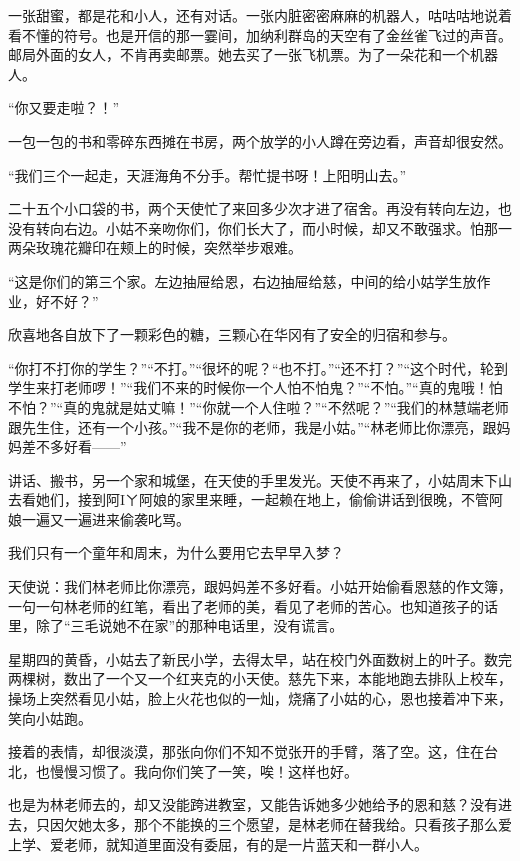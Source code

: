 \par 一张甜蜜，都是花和小人，还有对话。一张内脏密密麻麻的机器人，咕咕咕地说着看不懂的符号。也是开信的那一霎间，加纳利群岛的天空有了金丝雀飞过的声音。邮局外面的女人，不肯再卖邮票。她去买了一张飞机票。为了一朵花和一个机器人。
\par “你又要走啦？！”
\par 一包一包的书和零碎东西摊在书房，两个放学的小人蹲在旁边看，声音却很安然。
\par “我们三个一起走，天涯海角不分手。帮忙提书呀！上阳明山去。”
\par 二十五个小口袋的书，两个天使忙了来回多少次才进了宿舍。再没有转向左边，也没有转向右边。小姑不亲吻你们，你们长大了，而小时候，却又不敢强求。怕那一两朵玫瑰花瓣印在颊上的时候，突然举步艰难。
\par “这是你们的第三个家。左边抽屉给恩，右边抽屉给慈，中间的给小姑学生放作业，好不好？”
\par 欣喜地各自放下了一颗彩色的糖，三颗心在华冈有了安全的归宿和参与。
\par “你打不打你的学生？”“不打。”“很坏的呢？“也不打。”“还不打？”“这个时代，轮到学生来打老师啰！”“我们不来的时候你一个人怕不怕鬼？”“不怕。”“真的鬼哦！怕不怕？”“真的鬼就是姑丈嘛！”“你就一个人住啦？”“不然呢？”“我们的林慧端老师跟先生住，还有一个小孩。”“我不是你的老师，我是小姑。”“林老师比你漂亮，跟妈妈差不多好看——”
\par 讲话、搬书，另一个家和城堡，在天使的手里发光。天使不再来了，小姑周末下山去看她们，接到阿Iㄚ阿娘的家里来睡，一起赖在地上，偷偷讲话到很晚，不管阿娘一遍又一遍进来偷袭叱骂。
\par 我们只有一个童年和周末，为什么要用它去早早入梦？
\par 天使说：我们林老师比你漂亮，跟妈妈差不多好看。小姑开始偷看恩慈的作文簿，一句一句林老师的红笔，看出了老师的美，看见了老师的苦心。也知道孩子的话里，除了“三毛说她不在家”的那种电话里，没有谎言。
\par 星期四的黄昏，小姑去了新民小学，去得太早，站在校门外面数树上的叶子。数完两棵树，数出了一个又一个红夹克的小天使。慈先下来，本能地跑去排队上校车，操场上突然看见小姑，脸上火花也似的一灿，烧痛了小姑的心，恩也接着冲下来，笑向小姑跑。
\par 接着的表情，却很淡漠，那张向你们不知不觉张开的手臂，落了空。这，住在台北，也慢慢习惯了。我向你们笑了一笑，唉！这样也好。
\par 也是为林老师去的，却又没能跨进教室，又能告诉她多少她给予的恩和慈？没有进去，只因欠她太多，那个不能换的三个愿望，是林老师在替我给。只看孩子那么爱上学、爱老师，就知道里面没有委屈，有的是一片蓝天和一群小人。
